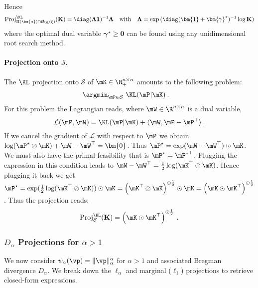     Hence 
    \begin{align}
        \operatorname{Proj}^{\KL}_{\Pi(\bm{a}) \cap \mathcal{B}_{\KL}(\xi)}(\mathbf{K}) = \diag(\mathbf{\Lambda} \mathbf{1})^{-1} \mathbf{\Lambda} \quad \text{with} \quad \mathbf{\Lambda} = \exp{(\diag(\bm{1} + \bm{\gamma}^\star)^{-1} \log \mathbf{K})}
    \end{align}
    where the optimal dual variable $\bm{\gamma}^\star \bm{\geq} \bm{0}$ can be found using any unidimensional root search method.

    \paragraph{Projection onto $\mathcal{S}$.} The $\KL$ projection onto $\mathcal{S}$ of $\mK \in \R_+^{n \times n}$ amounts to the following problem:
    \begin{align}
        \argmin_{\mP \in \mathcal{S}} \ &\KL(\mP | \mK) \:.
    \end{align}
    For this problem the Lagrangian reads, where $\mW \in \R^{n \times n}$ is a dual variable, 
    \begin{equation}
    \mathcal{L}(\mP, \mW) = \KL(\mP | \mK) + \langle \mW, \mP -\mP^{\top} \rangle \:.
    \end{equation}
    If we cancel the gradient of $\mathcal{L}$ with respect to $\mP$ we obtain $\log(\mP^\star \oslash \mK) + \mW - \mW^\top = \bm{0}$. Thus $\mP^\star = \exp( \mW-\mW^\top) \odot \mK$. 
    We must also have the primal feasibility that is $\mP^\star = \mP^{\star \top}$. Plugging the expression in this condition leads to $\mW - \mW^\top= \frac{1}{2} \log(\mK^\top \oslash \mK)$. Hence plugging it back we get $\mP^\star = \exp( \frac{1}{2} \log(\mK^\top \oslash \mK)) \odot \mK = \left(\mK^\top \oslash \mK \right)^{\odot \frac {1}{2}} \odot \mK = \left(\mK \odot \mK^{\top}\right)^{\odot \frac {1}{2}}$. Thus the projection reads:
    \begin{equation}
        \operatorname{Proj}^{\KL}_{\mathcal{S}}(\mathbf{K}) = \left(\mK \odot \mK^{\top}\right)^{\odot \frac{1}{2}} \:.
    \end{equation}

    
    \subsubsection{$D_\alpha$ Projections for $\alpha > 1$}

    We now consider $\psi_{\alpha}(\vp) = \| \vp \|_{\alpha}^{\alpha}$ for $\alpha>1$ and associated Bregman divergence $D_{\alpha}$.
    We break down the $\ell_{\alpha}$ and marginal ($\ell_1$) projections to retrieve closed-form expressions.

